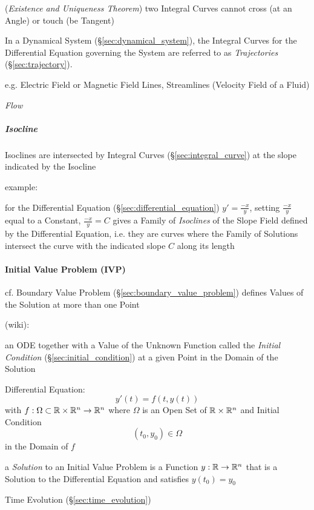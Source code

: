 {(\emph{Existence and Uniqueness Theorem}) two Integral Curves cannot cross (at
an Angle) or touch (be Tangent)

In a Dynamical System (\S\ref{sec:dynamical_system}), the Integral Curves for
the Differential Equation governing the System are referred to as
\emph{Trajectories} (\S\ref{sec:trajectory}).

e.g. Electric Field or Magnetic Field Lines, Streamlines (Velocity Field of a
Fluid)

\emph{Flow}



\subparagraph{Isocline}\label{sec:isocline}\hfill

Isoclines are intersected by Integral Curves (\S\ref{sec:integral_curve}) at
the slope indicated by the Isocline

example:

for the Differential Equation (\S\ref{sec:differential_equation}) $y' =
\frac{-x}{y}$, setting $\frac{-x}{y}$ equal to a Constant, $\frac{-x}{y} = C$
gives a Family of \emph{Isoclines} of the Slope Field defined by the
Differential Equation, i.e. they are curves where the Family of Solutions
intersect the curve with the indicated slope $C$ along its length



\paragraph{Initial Value Problem (IVP)}\label{sec:ivp}\hfill

\fist cf. Boundary Value Problem (\S\ref{sec:boundary_value_problem}) defines
Values of the Solution at more than one Point

(wiki):

an ODE together with a Value of the Unknown Function called the \emph{Initial
  Condition} (\S\ref{sec:initial_condition}) at a given Point in the Domain of
the Solution

Differential Equation:
\[
  y'(t) = f(t, y(t))
\]
with $f : \Omega \subset \mathbb{R} \times \mathbb{R}^n \rightarrow \mathbb{R}^n$ where
$\Omega$ is an Open Set of $\mathbb{R} \times \mathbb{R}^n$ and Initial Condition
\[
  (t_0, y_0) \in \Omega
\]
in the Domain of $f$

a \emph{Solution} to an Initial Value Problem is a Function $y : \mathbb{R}
\rightarrow \mathbb{R}^n$ that is a Solution to the Differential Equation and
satisfies $y(t_0) = y_0$

\fist Time Evolution (\S\ref{sec:time_evolution})

}
